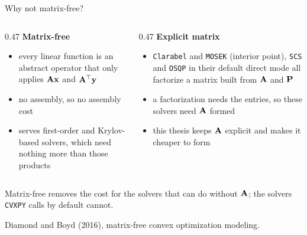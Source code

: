 \documentclass[10pt,mathserif,aspectratio=169]{beamer}
\newcommand{\bul}{\setlength\itemsep{1.1ex}}
\newcommand{\cvxpy}{\texttt{CVXPY}}
\begin{document}
\begin{frame}[label=bk-matfree]{Why not matrix-free?}
\vspace{-0.5ex}
\begin{columns}[T,onlytextwidth]
\begin{column}{0.47\textwidth}
{\small\color{polyblue}\textbf{Matrix-free}}
\begin{itemize}\footnotesize\bul
  \item every linear function is an abstract operator that only applies $\mathbf{A}\mathbf{x}$
        and $\mathbf{A}^\top\mathbf{y}$
  \item no assembly, so no assembly cost
  \item serves first-order and Krylov-based solvers, which need nothing more than those
        products
\end{itemize}
\end{column}
\begin{column}{0.47\textwidth}
{\small\color{polyblue}\textbf{Explicit matrix}}
\begin{itemize}\footnotesize\bul
  \item \texttt{Clarabel} and \texttt{MOSEK} (interior point), \texttt{SCS} and \texttt{OSQP}
        in their default direct mode all factorize a matrix built from $\mathbf{A}$ and
        $\mathbf{P}$
  \item a factorization needs the entries, so these solvers need $\mathbf{A}$ formed
  \item this thesis keeps $\mathbf{A}$ explicit and makes it cheaper to form
\end{itemize}
\end{column}
\end{columns}

\vspace{2ex}
\begin{center}\small\color{polyblue}
Matrix-free removes the cost for the solvers that can do without $\mathbf{A}$; the solvers
\cvxpy{} calls by default cannot.
\end{center}

\vfill
{\scriptsize\color{black!55} Diamond and Boyd (2016), matrix-free convex optimization
modeling.}
\end{frame}
\end{document}
